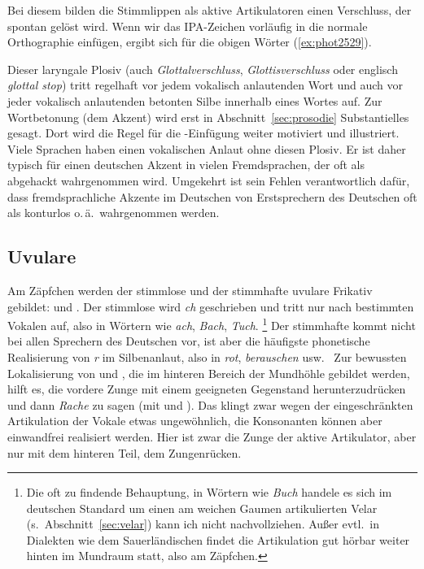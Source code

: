 Bei diesem bilden die Stimmlippen als aktive Artikulatoren einen Verschluss, der spontan gelöst wird.
Wenn wir das IPA-Zeichen  vorläufig in die normale Orthographie einfügen, ergibt sich für die obigen Wörter (\ref{ex:phot2529}).

\begin{exe}
  \ex\label{ex:phot2529}
  \begin{xlist}
  \end{xlist}
\end{exe}

Dieser laryngale Plosiv (auch \textit{Glottalverschluss}, \textit{Glottisverschluss} oder englisch \textit{glottal stop}) tritt regelhaft vor jedem vokalisch anlautenden Wort und auch vor jeder vokalisch anlautenden betonten Silbe innerhalb eines Wortes auf.
Zur Wortbetonung (dem Akzent) wird erst in Abschnitt~\ref{sec:prosodie} Substantielles gesagt.
Dort wird die Regel für die \textipa{[P]}-Einfügung weiter motiviert und illustriert.
Viele Sprachen haben einen vokalischen Anlaut ohne diesen Plosiv.
Er ist daher typisch für einen deutschen Akzent in vielen Fremdsprachen, der oft als abgehackt wahrgenommen wird.
Umgekehrt ist sein Fehlen verantwortlich dafür, dass fremdsprachliche Akzente im Deutschen von Erstsprechern des Deutschen oft als konturlos o.\,ä.\ wahrgenommen werden.

\subsection{Uvulare}


Am Zäpfchen werden der stimmlose und der stimmhafte uvulare Frikativ gebildet: \textipa{[X]} und \textipa{[K]}.
Der stimmlose wird \textit{ch} geschrieben und tritt nur nach bestimmten Vokalen auf, also in Wörtern wie \textit{ach}, \textit{Bach}, \textit{Tuch}.%
\footnote{Die oft zu findende Behauptung, in Wörtern wie \textit{Buch} handele es sich im deutschen Standard um einen am weichen Gaumen artikulierten Velar \textipa{[x]} (s.\ Abschnitt~\ref{sec:velar}) kann ich nicht nachvollziehen.
Außer evtl.\ in Dialekten wie dem Sauerländischen findet die Artikulation gut hörbar weiter hinten im Mundraum statt, also am Zäpfchen.
}
Der stimmhafte kommt nicht bei allen Sprechern des Deutschen vor, ist aber die häufigste phonetische Realisierung von \textit{r} im Silbenanlaut, also in \textit{rot}, \textit{berauschen} usw.
\TuBegin~Zur bewussten Lokalisierung von \textipa{[X]} und \textipa{[K]}, die im hinteren Bereich der Mundhöhle gebildet werden, hilft es, die vordere Zunge mit einem geeigneten Gegenstand herunterzudrücken und dann \zB \textit{Rache} zu sagen (mit \textipa{[K]} und \textipa{[X]}).
Das klingt zwar wegen der eingeschränkten Artikulation der Vokale etwas ungewöhnlich, die Konsonanten können aber einwandfrei realisiert werden.
Hier ist zwar die Zunge der aktive Artikulator, aber nur mit dem hinteren Teil, dem Zungenrücken.

